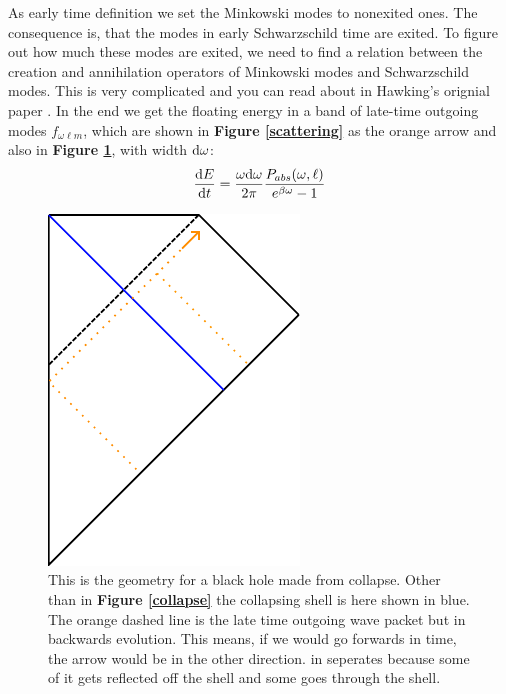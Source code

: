 	As early time definition we set the Minkowski modes to nonexited ones. The consequence is, that the modes in early Schwarzschild time are exited. 
	To figure out how much these modes are exited, we need to find a relation between the creation and annihilation operators of Minkowski modes and Schwarzschild modes. This is very complicated and you can read about in Hawking's orignial paper \cite{Hawking}. In the end we get the floating energy in a band of late-time outgoing modes $f_{\omega \ell m}$, which are shown in \textbf{Figure \ref{scattering}} as the orange arrow and also in \textbf{Figure \ref{collapse2}}, with width $\mathrm{d} \omega$: 
	\begin{align}
		\frac{\mathrm{d} E}{\mathrm{d} t} = \frac{\omega \mathrm{d} \omega}{2\pi}
		\frac{P_{abs}(\omega,\ell)}{e^{\beta \omega}-1}
	\end{align} 
	\begin{figure}
		\begin{center}
			\includegraphics[scale=1]{collapse2}
			\caption{This is the geometry for a black hole made from collapse. Other than in \textbf{Figure \ref{collapse}} the collapsing shell is here shown in blue. The orange dashed line is the late time outgoing wave packet but in backwards evolution. This means, if we would go forwards in time, the arrow would be in the other direction. in seperates because some of it gets reflected off the shell and some goes through the shell.} \label{collapse2}
		\end{center}
	\end{figure}